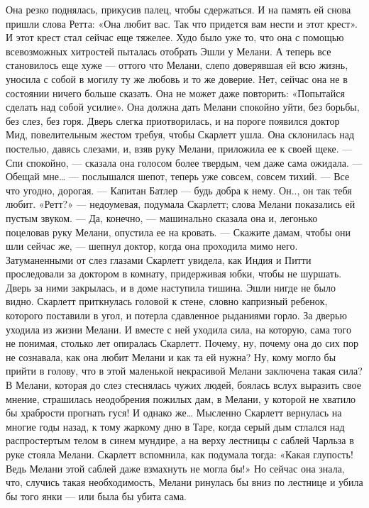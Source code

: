 Она резко поднялась, прикусив палец, чтобы сдержаться. И на память ей снова пришли слова Ретта: «Она любит вас. Так что придется вам нести и этот крест». И этот крест стал сейчас еще тяжелее. Худо было уже то, что она с помощью всевозможных хитростей пыталась отобрать Эшли у Мелани. А теперь все становилось еще хуже — оттого что Мелани, слепо доверявшая ей всю жизнь, уносила с собой в могилу ту же любовь и то же доверие. Нет, сейчас она не в состоянии ничего больше сказать. Она не может даже повторить: «Попытайся сделать над собой усилие». Она должна дать Мелани спокойно уйти, без борьбы, без слез, без горя.
Дверь слегка приотворилась, и на пороге появился доктор Мид, повелительным жестом требуя, чтобы Скарлетт ушла. Она склонилась над постелью, давясь слезами, и, взяв руку Мелани, приложила ее к своей щеке.
— Спи спокойно, — сказала она голосом более твердым, чем даже сама ожидала.
— Обещай мне… — послышался шепот, теперь уже совсем, совсем тихий.
— Все что угодно, дорогая.
— Капитан Батлер — будь добра к нему. Он.., он так тебя любит.
«Ретт?» — недоумевая, подумала Скарлетт; слова Мелани показались ей пустым звуком.
— Да, конечно, — машинально сказала она и, легонько поцеловав руку Мелани, опустила ее на кровать.
— Скажите дамам, чтобы они шли сейчас же, — шепнул доктор, когда она проходила мимо него.
Затуманенными от слез глазами Скарлетт увидела, как Индия и Питти проследовали за доктором в комнату, придерживая юбки, чтобы не шуршать. Дверь за ними закрылась, и в доме наступила тишина. Эшли нигде не было видно. Скарлетт приткнулась головой к стене, словно капризный ребенок, которого поставили в угол, и потерла сдавленное рыданиями горло. За дверью уходила из жизни Мелани. И вместе с ней уходила сила, на которую, сама того не понимая, столько лет опиралась Скарлетт. Почему, ну, почему она до сих пор не сознавала, как она любит Мелани и как та ей нужна? Ну, кому могло бы прийти в голову, что в этой маленькой некрасивой Мелани заключена такая сила? В Мелани, которая до слез стеснялась чужих людей, боялась вслух выразить свое мнение, страшилась неодобрения пожилых дам, в Мелани, у которой не хватило бы храбрости прогнать гуся! И однако же…
Мысленно Скарлетт вернулась на многие годы назад, к тому жаркому дню в Таре, когда серый дым стлался над распростертым телом в синем мундире, а на верху лестницы с саблей Чарльза в руке стояла Мелани. Скарлетт вспомнила, как подумала тогда: «Какая глупость! Ведь Мелани этой саблей даже взмахнуть не могла бы!» Но сейчас она знала, что, случись такая необходимость, Мелани ринулась бы вниз по лестнице и убила бы того янки — или была бы убита сама.
